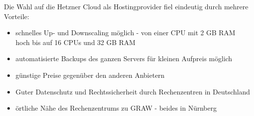 Die Wahl auf die Hetzner Cloud als Hostingprovider fiel eindeutig durch mehrere Vorteile:
\begin{itemize}
    \item schnelles Up- und Downscaling möglich - von einer CPU mit 2 GB RAM hoch bis auf 16 CPUs und 32 GB RAM
    \item automatisierte Backups des ganzen Servers für kleinen Aufpreis möglich
    \item günstige Preise gegenüber den anderen Anbietern
    \item Guter Datenschutz und Rechtssicherheit durch Rechenzentren in Deutschland
    \item örtliche Nähe des Rechenzentrums zu GRAW - beides in Nürnberg
\end{itemize}
